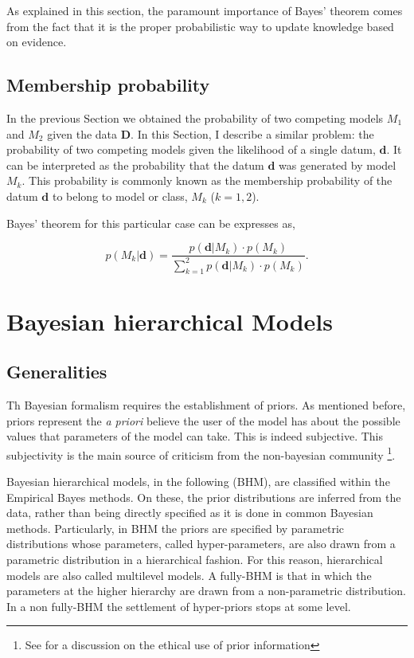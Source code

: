 As explained in this section, the paramount importance of Bayes' theorem comes from the fact that it is the proper probabilistic way to update knowledge based on evidence.

\subsection{Membership probability}

In the previous Section we obtained the probability of two competing models $M_1$ and $M_2$ given the data $\mathbf{D}$. In this Section, I describe a similar problem: the probability of two competing models given the likelihood of a single datum, $\mathbf{d}$. It can be interpreted as the probability that the datum $\mathbf{d}$ was generated by model $M_k$. This probability is commonly known as the membership probability of the datum $\mathbf{d}$ to belong to model or class, $M_k$ ($k=1,2$). 

Bayes' theorem for this particular case can be expresses as,

\begin{equation}
\label{eq:prob}
p( M_k | \mathbf{d}) =\frac{p(\mathbf{d}|M_k)\cdot p(M_k)}{\sum_{k=1}^2 p(\mathbf{d}|M_k)\cdot p(M_k)}.
\end{equation}


\section{Bayesian hierarchical Models}
\label{sect:BHM}
\subsection{Generalities}
Th Bayesian formalism requires the establishment of priors. As mentioned before, priors represent the \emph{a priori} believe the user of the model has about the possible values that parameters of the model can take. This is indeed subjective. This subjectivity is the main source of criticism from the non-bayesian community \footnote{See \citet{Gelman2012} for a discussion on the ethical use of prior information}. 

Bayesian hierarchical models, in the following (BHM), are classified within the Empirical Bayes methods. On these, the prior distributions are inferred from the data, rather than being directly specified as  it is done in common Bayesian methods. Particularly, in BHM the priors are specified by parametric distributions whose parameters, called hyper-parameters, are also drawn from a parametric distribution in a hierarchical fashion. For this reason, hierarchical models are also called multilevel models. A fully-BHM is that in which the parameters at the higher hierarchy are drawn from a non-parametric distribution. In a non fully-BHM the settlement of hyper-priors stops at some level. 

